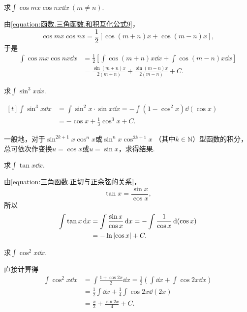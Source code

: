 \begin{example}
求\(\int \cos mx \cos nx \dd{x}\ (m \neq n)\).
\begin{solution}
由\cref{equation:函数.三角函数.和积互化公式9}，
\[
	\cos mx \cos nx
	= \frac12 [\cos(m+n)x + \cos(m-n)x],
\]
于是\begin{align}
	\int \cos mx \cos nx \dd{x}
	&= \frac12 \left[
		\int \cos(m+n)x \dd{x}
		+ \int \cos(m-n)x \dd{x}
	\right]
	\nonumber \\
	&= \frac{\sin(m+n)x}{2(m+n)}
		+ \frac{\sin(m-n)x}{2(m-n)}
		+ C.
\end{align}
\end{solution}
\end{example}

\begin{example}
求\(\int \sin^3 x \dd{x}\).
\begin{solution}
\(\begin{aligned}[t]
	\int \sin^3 x \dd{x}
	&= \int \sin^2 x \cdot \sin x \dd{x}
	= -\int (1 - \cos^2 x) \dd(\cos x) \\
	&= -\cos x + \frac{1}{3} \cos^3 x + C.
\end{aligned}\)
\end{solution}
\end{example}

一般地，对于\(\sin^{2k+1} x \cos^n x\)或\(\sin^n x \cos^{2k+1} x\)
（其中\(k\in\mathbb{N}\)）型函数的积分，
总可依次作变换\(u = \cos x\)或\(u = \sin x\)，求得结果.

\begin{example}
求\(\int \tan x \dd{x}\).
\begin{solution}
由\cref{equation:三角函数.正切与正余弦的关系}，
\[
	\tan x = \frac{\sin x}{\cos x},
\]
所以\begin{align}
	\int \tan x \dd{x}
	&= \int \frac{\sin x}{\cos x} \dd{x}
	= - \int \frac{1}{\cos x} \dd(\cos x)
	\nonumber \\
	&= - \ln\abs{\cos x} + C.
\end{align}
\end{solution}
\end{example}

\begin{example}
求\(\int \cos^2 x \dd{x}\).
\begin{solution}
直接计算得
\begin{align*}
	\int \cos^2 x \dd{x}
	&= \int \frac{1 + \cos 2x}{2} \dd{x}
	= \frac{1}{2} \left( \int \dd{x} + \int \cos 2x \dd{x} \right) \\
	&= \frac{1}{2} \int \dd{x} + \frac{1}{4} \int \cos 2x \dd(2x) \\
	&= \frac{x}{2} + \frac{\sin 2x}{4} + C.
\end{align*}
\end{solution}
\end{example}


